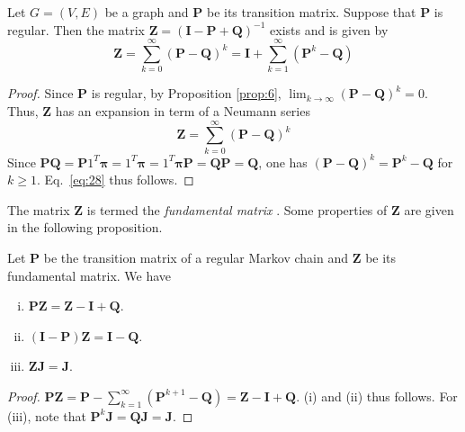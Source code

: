 \begin{proposition}
  \label{prop:7}
  Let $G = (V,E)$ be a graph and $\mathbf{P}$ be its transition
  matrix. Suppose that $\mathbf{P}$ is regular. Then the matrix $\mathbf{Z} =
  (\mathbf{I} - \mathbf{P} + \mathbf{Q})^{-1}$ exists and is given by
  \begin{equation}
    \label{eq:28}
    \mathbf{Z} = \sum_{k=0}^{\infty}(\mathbf{P} - \mathbf{Q})^{k} = \mathbf{I} +
    \sum_{k=1}^{\infty}(\mathbf{P}^{k} - \mathbf{Q})
  \end{equation}
  
\end{proposition}
\begin{proof}
  Since $\mathbf{P}$ is regular, by Proposition \ref{prop:6}, $\lim_{k
    \rightarrow \infty}(\mathbf{P} - \mathbf{Q})^{k} = 0$. Thus, $\mathbf{Z}$ has
  an expansion in term of a Neumann series
  \begin{equation}
    \label{eq:29}
    \mathbf{Z} = \sum_{k=0}^{\infty}(\mathbf{P} - \mathbf{Q})^{k}
  \end{equation}
  Since $\mathbf{P}\mathbf{Q} = \mathbf{P}1^{T}\mathbf{\pi} = 1^{T}\mathbf{\pi} = 
  1^{T}\mathbf{\pi}\mathbf{P} = \mathbf{Q}\mathbf{P} = \mathbf{Q}$,  
  one has $(\mathbf{P} - \mathbf{Q})^{k} = \mathbf{P}^{k} - \mathbf{Q}$ for $k \geq
  1$. Eq.~\eqref{eq:28} thus follows. 
\end{proof}
The matrix $\mathbf{Z}$ is termed the {\em fundamental matrix}
\citep{kemeny83:_finit_markov_chain}. Some properties of
$\mathbf{Z}$ are given in the following proposition.
\begin{proposition}
  \label{prop:8}
  Let $\mathbf{P}$ be the transition matrix of a regular Markov chain and
  $\mathbf{Z}$ be its fundamental matrix. We have
  \begin{enumerate}[(i)]
  \item $\mathbf{P}\mathbf{Z} = \mathbf{Z} - \mathbf{I} + \mathbf{Q}$. 
  \item $(\mathbf{I} - \mathbf{P})\mathbf{Z} = \mathbf{I} - \mathbf{Q}$.
  \item $\mathbf{Z} \mathbf{J} = \mathbf{J}$. 
  \end{enumerate}
\end{proposition}
\begin{proof}
  $\mathbf{P}\mathbf{Z} = \mathbf{P} - \sum_{k=1}^{\infty}(\mathbf{P}^{k+1} - \mathbf{Q})
  = \mathbf{Z} - \mathbf{I} + \mathbf{Q}$. (i) and (ii) thus follows. For (iii),
  note that $\mathbf{P}^{k}\mathbf{J} = \mathbf{Q}\mathbf{J} = \mathbf{J}$. 
\end{proof}
